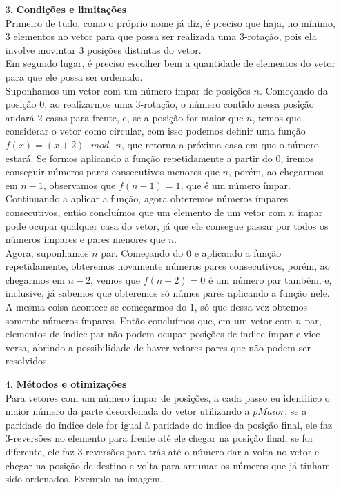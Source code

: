 \documentclass[12pt, a4paper]{article} %
\begin{document}
\begin{enumerate}
\large
\item[3.]\textbf{Condições e limitações}
\normalsize\\[0.5cm]
Primeiro de tudo, como o próprio nome já diz, é preciso que haja, no mínimo, 3 elementos no vetor para que possa ser realizada uma 3-rotação, pois ela involve movintar 3 posições distintas do vetor.\\
Em segundo lugar, é preciso escolher bem a quantidade de elementos do vetor para que ele possa ser ordenado.\\
Suponhamos um vetor com um número ímpar de posições $n$. Começando da posição $0$, ao realizarmos uma 3-rotação, o número contido nessa posição andará $2$ casas para frente, e, se a posição for maior que $n$, temos que considerar o vetor como circular, com isso podemos definir uma função $f(x) = (x + 2) \text{ }mod\text{ }n$, que retorna a próxima casa em que o número estará. Se formos aplicando a função repetidamente a partir do $0$, iremos conseguir números pares consecutivos menores que $n$, porém, ao chegarmos em $n-1$, observamos que $f(n-1) = 1$, que é um número ímpar. Continuando a aplicar a função, agora obteremos números ímpares consecutivos, então concluímos que um elemento de um vetor com $n$ ímpar pode ocupar qualquer casa do vetor, já que ele consegue passar por todos os números ímpares e pares menores que $n$.\\
Agora, suponhamos $n$ par. Começando do $0$ e aplicando a função repetidamente, obteremos novamente números pares consecutivos, porém, ao chegarmos em $n-2$, vemos que $f(n-2) = 0$ é um número par também, e, inclusive, já sabemos que obteremos só númes pares aplicando a função nele. A mesma coisa acontece se começarmos do $1$, só que dessa vez obtemos somente números ímpares. Então concluímos que, em um vetor com $n$ par, elementos de índice par não podem ocupar posições de índice ímpar e vice versa, abrindo a possibilidade de haver vetores pares que não podem ser resolvidos.\\
\large
\item[4.]\textbf{Métodos e otimizações}
\normalsize\\[0.5cm]
Para vetores com um número ímpar de posições, a cada passo eu identifico o maior número da parte desordenada do vetor utilizando a $pMaior$, se a paridade do índice dele for igual à paridade do índice da posição final, ele faz 3-reversões no elemento para frente até ele chegar na posição final, se for diferente, ele faz 3-reversões para trás até o número dar a volta no vetor e chegar na posição de destino e volta para arrumar os números que já tinham sido ordenados. Exemplo na imagem.

\end{enumerate}
\end{document}
